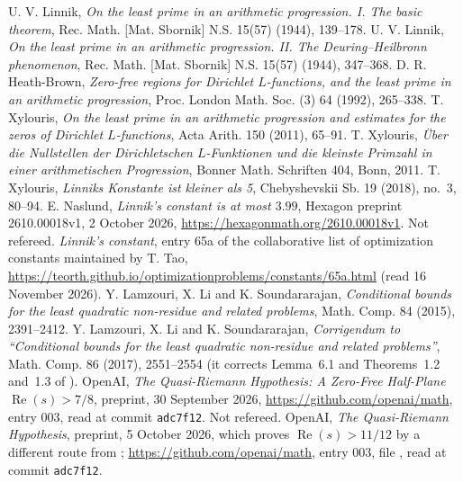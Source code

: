  U. V. Linnik, \emph{On the least prime in an arithmetic progression. I. The basic theorem},
  Rec. Math. [Mat. Sbornik] N.S. 15(57) (1944), 139--178.
 U. V. Linnik, \emph{On the least prime in an arithmetic progression. II. The Deuring--Heilbronn
  phenomenon}, Rec. Math. [Mat. Sbornik] N.S. 15(57) (1944), 347--368.
 D. R. Heath-Brown, \emph{Zero-free regions for Dirichlet $L$-functions, and the least prime
  in an arithmetic progression}, Proc. London Math. Soc. (3) 64 (1992), 265--338.
 T. Xylouris, \emph{On the least prime in an arithmetic progression and estimates for the zeros
of
  Dirichlet $L$-functions}, Acta Arith. 150 (2011), 65--91.
 T. Xylouris, \emph{\"Uber die Nullstellen der Dirichletschen $L$-Funktionen und die kleinste
  Primzahl in einer arithmetischen Progression}, Bonner Math. Schriften 404, Bonn, 2011.
 T. Xylouris, \emph{Linniks Konstante ist kleiner als 5}, Chebyshevskii Sb. 19 (2018), no.~3,
  80--94.
 E. Naslund, \emph{Linnik's constant is at most $3.99$}, Hexagon preprint 2610.00018v1, 2 October
  2026, \url{https://hexagonmath.org/2610.00018v1}. Not refereed.
 \emph{Linnik's constant}, entry 65a of the collaborative list of optimization constants
  maintained by T. Tao, \url{https://teorth.github.io/optimizationproblems/constants/65a.html} (read 16 November 2026).
 Y. Lamzouri, X. Li and K. Soundararajan, \emph{Conditional bounds for the least quadratic non-residue
  and related problems}, Math. Comp. 84 (2015), 2391--2412.
 Y. Lamzouri, X. Li and K. Soundararajan, \emph{Corrigendum to ``Conditional bounds for the least
  quadratic non-residue and related problems''}, Math. Comp. 86 (2017), 2551--2554 (it corrects Lemma~6.1 and
  Theorems~1.2 and~1.3 of \cite{lls}).
 OpenAI, \emph{The Quasi-Riemann Hypothesis: A Zero-Free Half-Plane $\operatorname{Re}(s) > 7/8$},
  preprint, 30 September 2026, \url{https://github.com/openai/math}, entry 003, read at commit \texttt{adc7f12}. Not
  refereed.
 OpenAI, \emph{The Quasi-Riemann Hypothesis}, preprint, 5 October 2026, which proves
  $\operatorname{Re}(s) > 11/12$ by a different route from \cite{openai-main}; \url{https://github.com/openai/math},
  entry 003, file
  , read at commit \texttt{adc7f12}.
